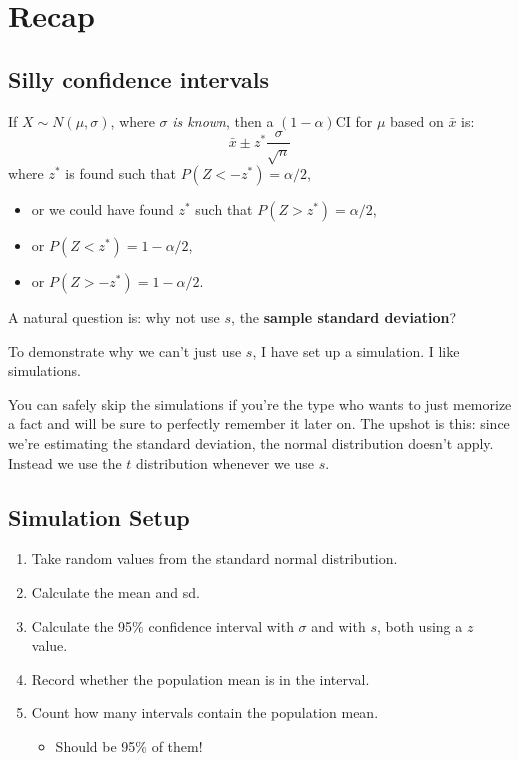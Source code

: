 \documentclass[
  letterpaper,
  DIV=11,
  numbers=noendperiod,
  oneside]{scrreprt}
\providecommand{\tightlist}{%
  \setlength{\itemsep}{0pt}\setlength{\parskip}{0pt}}\usepackage{longtable,booktabs,array}
\begin{document}
\hypertarget{recap}{%
\section{Recap}\label{recap}}

\hypertarget{silly-confidence-intervals}{%
\subsection{Silly confidence
intervals}\label{silly-confidence-intervals}}

If \(X\sim N(\mu,\sigma)\), where \(\sigma\) \emph{is known}, then a
\((1-\alpha)\)CI for \(\mu\) based on \(\bar x\) is: \[
\bar x \pm z^*\frac{\sigma}{\sqrt{n}}
\] where \(z^*\) is found such that \(P(Z < -z^*) = \alpha/2\),

\begin{itemize}
\tightlist
\item
  or we could have found \(z^*\) such that \(P(Z > z^*) = \alpha/2\),
\item
  or \(P(Z < z^*) = 1 - \alpha/2\),
\item
  or \(P(Z > -z^*) = 1 - \alpha/2\).
\end{itemize}

A natural question is: why not use \(s\), the \textbf{sample standard
deviation}?

To demonstrate why we can't just use \(s\), I have set up a simulation.
I like simulations.

You can safely skip the simulations if you're the type who wants to just
memorize a fact and will be sure to perfectly remember it later on. The
upshot is this: since we're estimating the standard deviation, the
normal distribution doesn't apply. Instead we use the \(t\) distribution
whenever we use \(s\).

\hypertarget{simulation-setup}{%
\subsection{Simulation Setup}\label{simulation-setup}}

\begin{enumerate}
\def\labelenumi{\arabic{enumi}.}
\tightlist
\item
  Take random values from the standard normal distribution.
\item
  Calculate the mean and sd.
\item
  Calculate the 95\% confidence interval with \(\sigma\) and with \(s\),
  both using a \(z\) value.
\item
  Record whether the population mean is in the interval.
\item
  Count how many intervals contain the population mean.

  \begin{itemize}
  \tightlist
  \item
    Should be 95\% of them!
  \end{itemize}
\end{enumerate}
\end{document}
